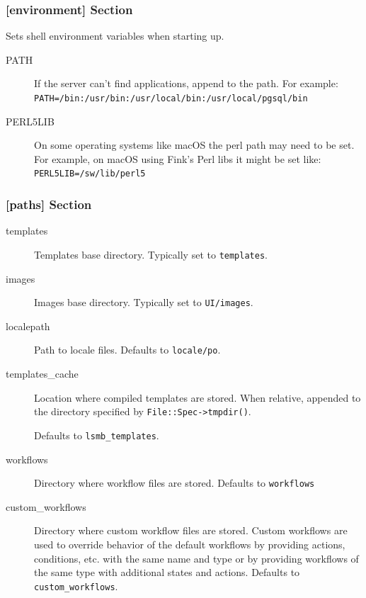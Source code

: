 \subsubsection{[environment] Section}
\label{subsubsec-global-config-ledgersmb-conf-environment}

        Sets shell environment variables when starting up.

\begin{description}
        \item[PATH] If the server can't find applications, append to the path. For example:
        \texttt{PATH=/bin:/usr/bin:/usr/local/bin:/usr/local/pgsql/bin}
        \item [PERL5LIB] On some operating systems like macOS the perl path may need to be set. For example, on macOS using Fink's Perl libs it might be set like:
        \texttt{PERL5LIB=/sw/lib/perl5}
\end{description}


\subsubsection{[paths] Section}
\label{subsubsec-global-config-ledgersmb-conf-paths}

\begin{description}
        \item [templates] Templates base directory. Typically set to \texttt{templates}.
        \item [images] Images base directory. Typically set to \texttt{UI/images}.
        \item [localepath] Path to locale files. Defaults to \texttt{locale/po}.
        \item [templates\_cache] Location where compiled templates are stored. When relative, appended to the directory specified by \texttt{File::Spec->tmpdir()}. 
        
        Defaults to \texttt{lsmb\_templates}.
        \item [workflows] Directory where workflow files are stored. Defaults to \texttt{workflows}
        \item [custom\_workflows] Directory where custom workflow files are stored. Custom workflows are used to override behavior of the default workflows by providing actions, conditions, etc. with the same name and type or by providing workflows of the same type with additional states and actions. Defaults to \texttt{custom\_workflows}.
        
\end{description}

